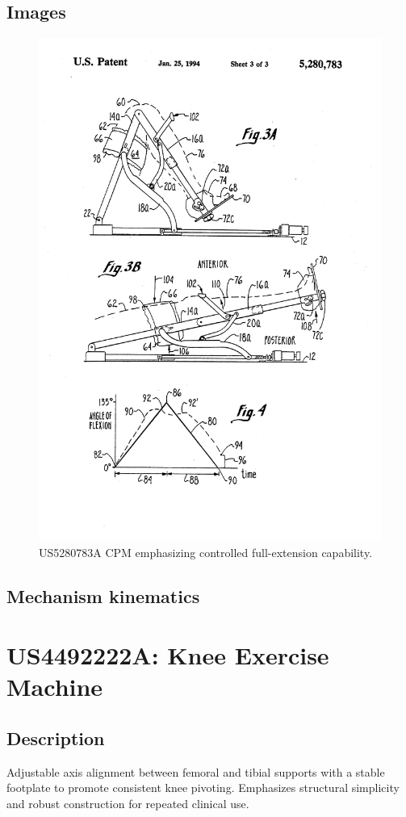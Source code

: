 \documentclass[11pt]{article}
\begin{document}
\subsection{Images}
\begin{figure}[H]
  \centering
  \includegraphics[width=0.54\linewidth]{US5280783_1.png}
  \caption{US5280783A CPM emphasizing controlled full-extension capability.}
  \label{fig:US5280783A}
\end{figure}

\subsection{Mechanism kinematics}

\section{US4492222A: Knee Exercise Machine}
\subsection{Description}
Adjustable axis alignment between femoral and tibial supports with a stable footplate to promote consistent knee pivoting. Emphasizes structural simplicity and robust construction for repeated clinical use.
\end{document}

